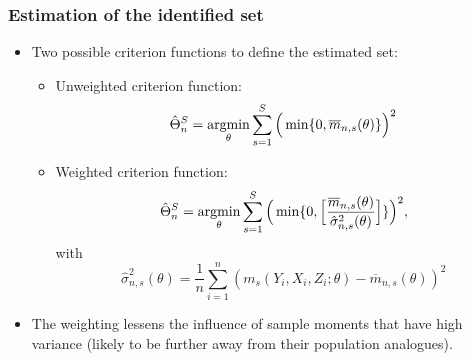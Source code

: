 \documentclass[notes=show]{beamer}
\begin{document}
\begin{frame}
\frametitle{Estimation of the identified set}

\begin{itemize}
\item Two possible criterion functions to define the estimated set: 

\begin{itemize}
\item Unweighted criterion function:  
\begin{equation*}
\hat{\Theta}^{S}_{n} = \operatornamewithlimits{argmin}_{\theta}\sum_{s=1}^{S}%
\Big(\min\{0,\overline{m}_{n,s}(\theta)\}\Big)^{2}
\end{equation*}

\item Weighted criterion function:  
\begin{equation*}
\hat{\Theta}^{S}_{n} = \operatornamewithlimits{argmin}_{\theta}\sum_{s=1}^{S}%
\Big(\min\{0,\Big[\frac{\overline{m}_{n,s}(\theta)}{\hat{\sigma}%
^{2}_{n,s}(\theta)}\Big]\}\Big)^{2},
\end{equation*}
with  
\begin{equation*}
\hat{\sigma}^{2}_{n,s}(\theta)=\frac{1}{n}%
\sum_{i=1}^{n}(m_{s}(Y_{i},X_{i},Z_{i};\theta)-\overline{m}%
_{n,s}(\theta))^{2}
\end{equation*}
\end{itemize}

\item The weighting lessens the influence of sample moments that have high
variance (likely to be further away from their population analogues).
\end{itemize}
\end{frame}

\end{document}
